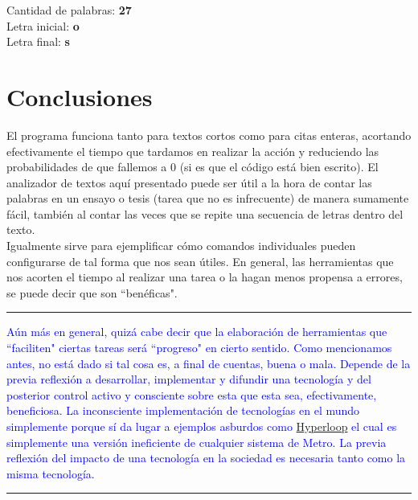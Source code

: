 \documentclass[15pt]{article}
\begin{document}
\noindent Cantidad de palabras: \textbf{27} \\

\noindent Letra inicial: \textbf{o} \\
Letra final: \textbf{s} \\

\section*{\Large{Conclusiones}}

El programa funciona tanto para textos cortos como para citas enteras, acortando efectivamente el tiempo que tardamos en realizar la acción y reduciendo las probabilidades de que fallemos a 0 (si es que el código está bien escrito). El analizador de textos aquí presentado puede ser útil a la hora de contar las palabras en un ensayo o tesis (tarea que no es infrecuente) de manera sumamente fácil, también al contar las veces que se repite una secuencia de letras dentro del texto.\\
Igualmente sirve para ejemplificar cómo comandos individuales pueden configurarse de tal forma que nos sean útiles. En general, las herramientas que nos acorten el tiempo al realizar una tarea o la hagan menos propensa a errores, se puede decir que son ``benéficas". \\

\hspace{-15pt}\textcolor{Blue}{\rule{18.5cm}{1pt}}
\vspace{3pt}

\textcolor{Blue}{Aún más en general, quizá cabe decir que la elaboración de herramientas que ``faciliten" ciertas tareas será ``progreso" en cierto sentido. Como mencionamos antes, no está dado si tal cosa es, a final de cuentas, buena o mala. Depende de la previa reflexión a desarrollar, implementar y difundir una tecnología y del posterior control activo y consciente sobre esta que esta sea, efectivamente, beneficiosa. La inconsciente implementación de tecnologías en el mundo simplemente porque sí da lugar a ejemplos asburdos como \href{https://es.wikipedia.org/wiki/Hyperloop}{Hyperloop} el cual es simplemente una versión ineficiente de cualquier sistema de Metro. La previa reflexión del impacto de una tecnología en la sociedad es necesaria tanto como la misma tecnología.} \\

\hspace{-15pt}\textcolor{Blue}{\rule{18.5cm}{1pt}}
\end{document}
